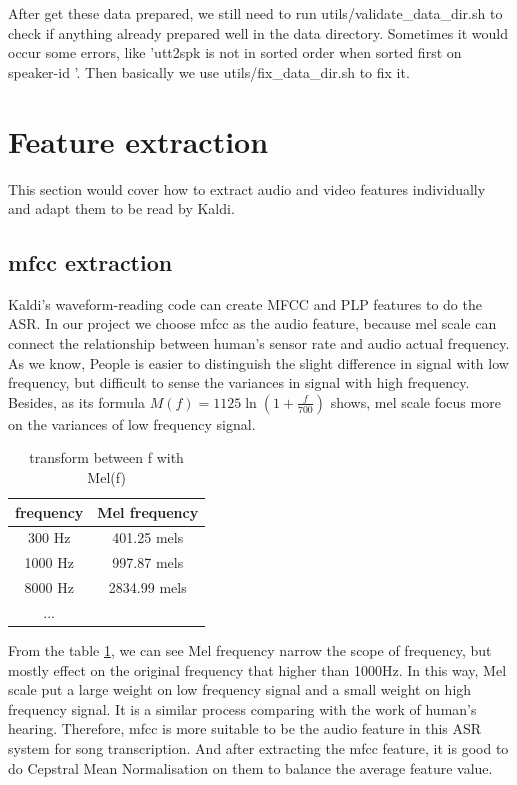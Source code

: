 After get these data prepared, we still need to run utils/validate\_data\_dir.sh to check if anything already prepared well in the data directory. Sometimes it would occur some errors, like 'utt2spk is not in sorted order when sorted first on speaker-id '. Then basically we use utils/fix\_data\_dir.sh to fix it.


\section{Feature extraction}
This section would cover how to extract audio and video features individually and adapt them to be read by Kaldi. 
\subsection{mfcc extraction}
Kaldi’s waveform-reading code can create MFCC and PLP features to do the ASR. 
In our project we choose mfcc as the audio feature, because mel scale can connect the relationship between human’s sensor rate and audio actual frequency. As we know, People is easier to distinguish the slight difference in signal with low frequency, but difficult to sense the variances in signal with high frequency. Besides, as its formula $M(f)=1125\ln (1+\frac{f}{700})$ shows, mel scale focus more on the variances of low frequency signal.
\begin{table}[ht]
\center
\begin{tabular}{c|c}
frequency  & Mel frequency\\ \hline
300 Hz  & 401.25 mels\\ 
1000 Hz  & 997.87 mels\\
8000 Hz  & 2834.99 mels\\ 
...\\ \hline
\end{tabular}
\caption{transform between f with Mel(f)}
\label{tab:melf}
\end{table}

From the table \ref{tab:melf}, we can see Mel frequency narrow the scope of frequency, but mostly effect on the original frequency that higher than 1000Hz.  In this way, Mel scale put a large weight on low frequency signal and a small weight on high frequency signal.  It is a similar process comparing with the work of human’s hearing.  Therefore, mfcc is more suitable to be the audio feature in this ASR system for song transcription.
And after extracting the mfcc feature, it is good to do Cepstral Mean Normalisation on them to balance the average feature value.

